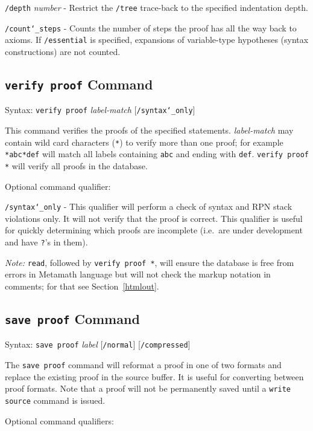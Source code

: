     \texttt{/depth} {\em number} - Restrict the \texttt{/tree} trace-back to the
        specified indentation depth.

    \texttt{/count{\char`\_}steps} - Counts the number of steps the proof has
       all the way back to axioms.  If \texttt{/essential} is specified,
       expansions of variable-type hypotheses (syntax constructions) are not counted.

\subsection{\texttt{verify proof} Command}
Syntax:  \texttt{verify proof} {\em label-match} [\texttt{/syntax{\char`\_}only}]

This command verifies the proofs of the specified statements.  {\em
label-match} may contain wild card characters (\texttt{*}) to verify
more than one proof; for example \verb/*abc*def/ will match all labels
containing \texttt{abc} and ending with \texttt{def}.  \texttt{verify
proof *} will verify all proofs in the database.

Optional command qualifier:

    \texttt{/syntax{\char`\_}only} - This qualifier will perform a check of syntax
        and RPN
        stack violations only.  It will not verify that the proof is
        correct.  This qualifier is useful for quickly determining which
        proofs are incomplete (i.e.\ are under development and have \texttt{?}'s
        in them).

{\em Note:} \texttt{read}, followed by \texttt{verify proof *}, will ensure
 the database is free
from errors in Metamath language but will not check the markup notation
in comments; for that
see Section~\ref{htmlout}.

\subsection{\texttt{save proof} Command}
Syntax:  \texttt{save proof} {\em label} [\texttt{/normal}]
   [\texttt{/compressed}]

The \texttt{save proof} command will reformat a proof in one of two formats and
replace the existing proof in the source buffer.  It is useful for
converting between proof formats.  Note that a proof will not be
permanently saved until a \texttt{write source} command is issued.

Optional command qualifiers:

